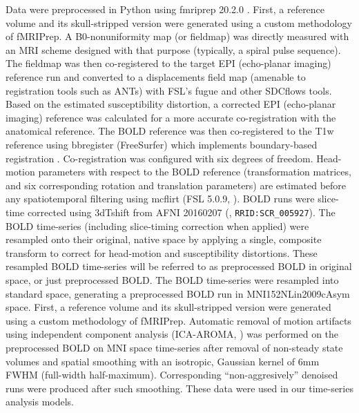 \documentclass[sn-mathphys,Numbered, super, referee, lineno]{sn-jnl}
\begin{document}
Data were preprocessed in Python using fmriprep 20.2.0 \citep{esteban2019}.  First, a reference volume and its skull-stripped version were generated using a custom methodology of fMRIPrep. A B0-nonuniformity map (or fieldmap) was directly measured with an MRI scheme designed with that purpose (typically, a spiral pulse sequence). The fieldmap was then co-registered to the target EPI (echo-planar imaging) reference run and converted to a displacements field map (amenable to registration tools such as ANTs) with FSL’s fugue and other SDCflows tools. Based on the estimated susceptibility distortion, a corrected EPI (echo-planar imaging) reference was calculated for a more accurate co-registration with the anatomical reference. The BOLD reference was then co-registered to the T1w reference using bbregister (FreeSurfer) which implements boundary-based registration \citep{greve2009}. Co-registration was configured with six degrees of freedom. Head-motion parameters with respect to the BOLD reference (transformation matrices, and six corresponding rotation and translation parameters) are estimated before any spatiotemporal filtering using mcflirt (FSL 5.0.9, \citet{jenkinson2002}). BOLD runs were slice-time corrected using 3dTshift from AFNI 20160207 (\citet{cox1997}, \verb+RRID:SCR_005927+). The BOLD time-series (including slice-timing correction when applied) were resampled onto their original, native space by applying a single, composite transform to correct for head-motion and susceptibility distortions. These resampled BOLD time-series will be referred to as preprocessed BOLD in original space, or just preprocessed BOLD. The BOLD time-series were resampled into standard space, generating a preprocessed BOLD run in MNI152NLin2009cAsym space. First, a reference volume and its skull-stripped version were generated using a custom methodology of fMRIPrep. Automatic removal of motion artifacts using independent component analysis (ICA-AROMA, \citet{pruim2015}) was performed on the preprocessed BOLD on MNI space time-series after removal of non-steady state volumes and spatial smoothing with an isotropic, Gaussian kernel of 6mm FWHM (full-width half-maximum). Corresponding “non-aggresively” denoised runs were produced after such smoothing.  These data were used in our time-series analysis models.
\end{document}

